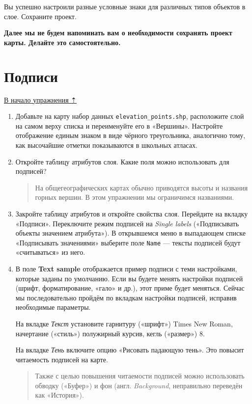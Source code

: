 \documentclass[
  12pt,
]{book}
\begin{document}
Вы успешно настроили разные условные знаки для различных типов объектов в слое. Сохраните проект.

\textbf{Далее мы не будем напоминать вам о необходимости сохранять проект карты. Делайте это самостоятельно.}

\hypertarget{map-design-general-labels}{%
\section{Подписи}\label{map-design-general-labels}}

\protect\hyperlink{map-design-general}{В начало упражнения ⇡}

\begin{enumerate}
\def\labelenumi{\arabic{enumi}.}
\item
  Добавьте на карту набор данных \texttt{elevation\_points.shp}, расположите слой на самом верху списка и переименуйте его в «Вершины». Настройте отображение единым знаком в виде чёрного треугольника, аналогично тому, как высочайшие отметки показываются в школьных атласах.
\item
  Откройте таблицу атрибутов слоя. Какие поля можно использовать для подписей?

  \begin{quote}
  На общегеографических картах обычно приводятся высоты и названия горных вершин. В этом упражнении мы ограничимся названиями.
  \end{quote}
\item
  Закройте таблицу атрибутов и откройте свойства слоя. Перейдите на вкладку «Подписи». Переключите режим подписей на \emph{Single labels} («Подписывать объекты значением атрибута»). В открывшемся меню в выпадающем списке «Подписывать значениями» выберите поле \texttt{Name} --- тексты подписей будут «считываться» из него.
\item
  В поле \textbf{Text sample} отображается пример подписи с теми настройками, которые заданы по умолчанию. Если вы будете менять настройки подписей (шрифт, форматирование, «гало» и др.), этот приме будет меняться. Сейчас мы последовательно пройдём по вкладкам настройки подписей, исправив необходимые параметры.

  На вкладке \emph{Текст} установите гарнитуру («шрифт») Times New Roman, начертание («стиль») полужирный курсив, кегль («размер») 8.

  На вкладке \emph{Тень} включите опцию «Рисовать падающую тень». Это повысит читаемость подписей на карте.

  \begin{quote}
  Также с целью повышения читаемости подписей можно использовать обводку («Буфер») и фон (англ. \emph{Background}, неправильно переведён как «История»).
  \end{quote}


\end{enumerate}
\end{document}
